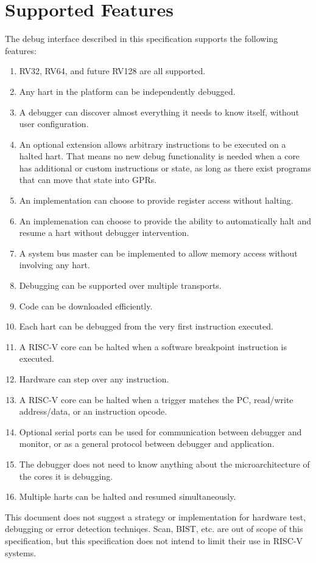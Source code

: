 
\section{Supported Features}

The debug interface described in this specification supports the following features:

\begin{enumerate}
   \item RV32, RV64, and future RV128 are all supported.
   \item Any hart in the platform can be independently debugged.
   \item A debugger can discover almost everything it needs to know itself,
       without user configuration.
   \item An optional extension allows arbitrary instructions to be executed on
       a halted hart. That means no new debug functionality is needed when a
       core has additional or custom instructions or state, as
       long as there exist programs
       that can move that state into GPRs.
   \item An implementation can choose to provide register access without
       halting.
   \item An implemenation can choose to provide the ability to automatically
     halt and resume a hart without debugger intervention.
   \item A system bus master can be implemented to allow memory access without
       involving any hart.
   \item Debugging can be supported over multiple transports.
   \item Code can be downloaded efficiently.
   \item Each hart can be debugged from the very first instruction executed.
   \item A RISC-V core can be halted when a software breakpoint instruction is
       executed.
   \item Hardware can step over any instruction.
   \item A RISC-V core can be halted when a trigger matches the PC, read/write
       address/data, or an instruction opcode.
   \item Optional serial ports can be used for communication between debugger
       and monitor, or as a general protocol between debugger and application.
   \item The debugger does not need to know anything about the microarchitecture
       of the cores it is debugging.
   \item Multiple harts can be halted and resumed simultaneously.
\end{enumerate}

This document does not suggest a strategy or implementation for hardware test,
debugging or error detection techniqes. Scan, BIST, etc. are out of scope of
this specification, but this specification does not intend to limit their use 
in RISC-V systems.
